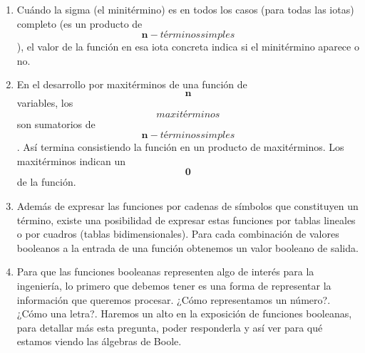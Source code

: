 \begin{enumerate}
\begin{enumerate}
    \[{{{{f_{B_{\mathbf{\mathrm{2}}}}{(x)}} = {f_{B_{2}}{({x_{1,}x_{2,...},x_{n}})}}} = {\sum\limits_{\iota \in {B_{\mathbf{\mathrm{2}}}}^{\mathbf{\mathrm{n}}}}{({\sigma_{1}^{\iota}{{(\iota_{1})} \cdot \sigma_{2}^{\iota}}{{(\iota_{2})} \cdot}...{\cdot \sigma_{n}^{\iota}}{{(\iota_{n})} \cdot {f_{B_{2}}{(\iota)}}}})}}} = \sum\limits_{\iota \in {B_{\mathbf{\mathrm{2}}}}^{\mathbf{\mathrm{n}}}}}{({\sigma^{\iota} \cdot {f_{B_{2}}{(\iota)}}})}\]\[\mathit{dónde}{}{}{}{}{}\sigma_{k}^{\iota}{{(\iota_{k})} \in {\{{\iota_{k},\overline{\iota_{k}}}\}}}{}{}{}{}y{}{}{}{}{{0 \leq k} \leq n}{}{}{}{}y{}{}{}{}\sigma^{\iota}{}\mathit{es}{}\mathit{un}{}\mathit{minitérmino}\]
  \item
    Cuándo la sigma (el minitérmino) es en todos los casos (para todas
    las iotas) completo (es un producto de
    \[\mathbf{{n - \mathit{términos}}\mathit{simples}}\]), el valor de
    la función en esa iota concreta indica si el minitérmino aparece o
    no.
  \item
    En el desarrollo por maxitérminos de una función de \[\mathbf{n}\]
    variables, los \[\mathbf{\mathit{maxitérminos}}\] son sumatorios de
    \[\mathbf{{n - \mathit{términos}}\mathit{simples}}\]. Así termina
    consis\-tiendo la función en un producto de maxitérminos. Los
    maxitérminos indican un \[\mathbf{0}\] de la función.
  \item
    Además de expresar las funciones por cadenas de símbolos que
    constituyen un térmi\-no, existe una posibilidad de expresar estas
    funciones por tablas lineales o por cua\-dros (tablas
    bidimensionales). Para cada combinación de valores booleanos a la
    en\-trada de una función obtenemos un valor booleano de salida.
  \item
    Para que las funciones booleanas representen algo de interés para la
    ingeniería, lo primero que debemos tener es una forma de representar
    la información que queremos procesar. ¿Cómo representamos un
    número?. ¿Cómo una letra?. Haremos un alto en la exposición de
    funciones booleanas, para detallar más esta pregunta, poder
    respon\-derla y así ver para qué estamos viendo las álgebras de
    Boole.
  \end{enumerate}
\end{enumerate}
